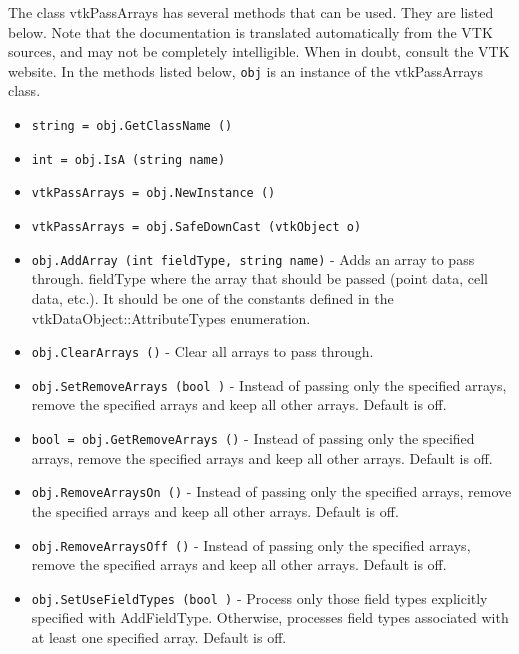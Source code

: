 The class vtkPassArrays has several methods that can be used.
  They are listed below.
Note that the documentation is translated automatically from the VTK sources,
and may not be completely intelligible.  When in doubt, consult the VTK website.
In the methods listed below, \verb|obj| is an instance of the vtkPassArrays class.
\begin{itemize}
\item  \verb|string = obj.GetClassName ()|

\item  \verb|int = obj.IsA (string name)|

\item  \verb|vtkPassArrays = obj.NewInstance ()|

\item  \verb|vtkPassArrays = obj.SafeDownCast (vtkObject o)|

\item  \verb|obj.AddArray (int fieldType, string name)| -  Adds an array to pass through.
 fieldType where the array that should be passed (point data, cell data, etc.).
 It should be one of the constants defined in the vtkDataObject::AttributeTypes
 enumeration.

\item  \verb|obj.ClearArrays ()| -  Clear all arrays to pass through.

\item  \verb|obj.SetRemoveArrays (bool )| -  Instead of passing only the specified arrays, remove the specified arrays
 and keep all other arrays. Default is off.

\item  \verb|bool = obj.GetRemoveArrays ()| -  Instead of passing only the specified arrays, remove the specified arrays
 and keep all other arrays. Default is off.

\item  \verb|obj.RemoveArraysOn ()| -  Instead of passing only the specified arrays, remove the specified arrays
 and keep all other arrays. Default is off.

\item  \verb|obj.RemoveArraysOff ()| -  Instead of passing only the specified arrays, remove the specified arrays
 and keep all other arrays. Default is off.

\item  \verb|obj.SetUseFieldTypes (bool )| -  Process only those field types explicitly specified with AddFieldType.
 Otherwise, processes field types associated with at least one specified
 array. Default is off.


\end{itemize}
